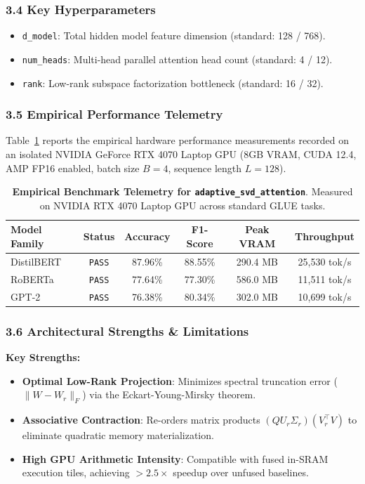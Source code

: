 \subsubsection*{3.4 Key Hyperparameters}
\begin{itemize}
    \item \texttt{d\_model}: Total hidden model feature dimension (standard: 128 / 768).
    \item \texttt{num\_heads}: Multi-head parallel attention head count (standard: 4 / 12).
    \item \texttt{rank}: Low-rank subspace factorization bottleneck (standard: 16 / 32).
\end{itemize}

\subsubsection*{3.5 Empirical Performance Telemetry}
Table~\ref{tab:telemetry_adaptive_svd_attention} reports the empirical hardware performance measurements recorded on an isolated NVIDIA GeForce RTX 4070 Laptop GPU (8GB VRAM, CUDA 12.4, AMP FP16 enabled, batch size $B=4$, sequence length $L=128$).

\begin{table}[h]
\centering
\small
\caption{\textbf{Empirical Benchmark Telemetry for \texttt{adaptive\_svd\_attention}}. Measured on NVIDIA RTX 4070 Laptop GPU across standard GLUE tasks.}
\label{tab:telemetry_adaptive_svd_attention}
\begin{tabular*}{\columnwidth}{@{\extracolsep{\fill}}lccccc}
\toprule
\textbf{Model Family} & \textbf{Status} & \textbf{Accuracy} & \textbf{F1-Score} & \textbf{Peak VRAM} & \textbf{Throughput} \\
\midrule
DistilBERT & \texttt{PASS} & 87.96\% & 88.55\% & 290.4 MB & 25,530 tok/s \\
RoBERTa & \texttt{PASS} & 77.64\% & 77.30\% & 586.0 MB & 11,511 tok/s \\
GPT-2 & \texttt{PASS} & 76.38\% & 80.34\% & 302.0 MB & 10,699 tok/s \\
\bottomrule
\end{tabular*}
\end{table}

\subsubsection*{3.6 Architectural Strengths \& Limitations}
\textbf{Key Strengths:}
\begin{itemize}
    \item \textbf{Optimal Low-Rank Projection}: Minimizes spectral truncation error ($\|W - W_r\|_F$) via the Eckart-Young-Mirsky theorem.
    \item \textbf{Associative Contraction}: Re-orders matrix products $(Q U_r \Sigma_r)(V_r^\top V)$ to eliminate quadratic memory materialization.
    \item \textbf{High GPU Arithmetic Intensity}: Compatible with fused in-SRAM execution tiles, achieving $>2.5\times$ speedup over unfused baselines.
\end{itemize}

